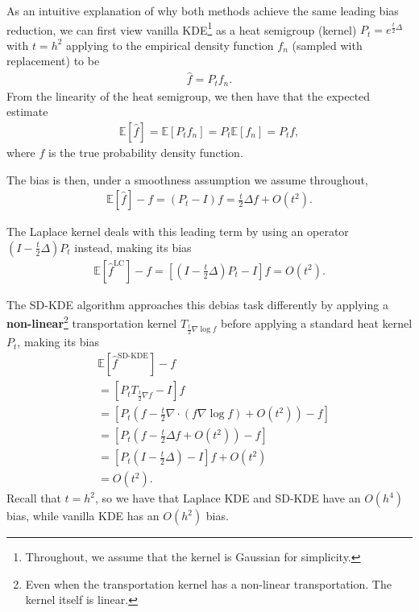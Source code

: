 As an intuitive explanation of why both methods achieve the same leading bias reduction, we can first view vanilla KDE\footnote{Throughout, we assume that the kernel is Gaussian for simplicity.} as a heat semigroup (kernel) $P_{t} = e^{\frac{t}{2}\Delta}$ with $t = h^2$ applying to the empirical density  function $f_n$ (sampled with replacement) to be
\begin{align*}
    \hat{f} = P_t f_n.
\end{align*}
From the linearity of the heat semigroup, we then have that the expected estimate
\begin{align*}
    \mathbb{E}\left[\hat{f}\right]
    =\mathbb{E}\left[P_t f_n\right]
    =P_t\mathbb{E}\left[ f_n\right]
    =P_tf,
\end{align*}
where $f$ is the true probability density function.

The bias is then, under a smoothness assumption we assume throughout,
\begin{align*}
    \mathbb{E}\left[\hat{f}\right]-f = (P_t-I)f = \frac{t}{2} \Delta f + O(t^2).
\end{align*}

The Laplace kernel deals with this leading term by using an operator $\left(I-\frac{t}{2}\Delta\right)P_t$ instead, making its bias
\begin{align*}
    \mathbb{E}\left[\hat{f}^{\text{LC}}\right]-f = \left[\left(I-\frac{t}{2}\Delta\right)P_t-I\right]f = O(t^2).
\end{align*}

The SD-KDE algorithm approaches this debias task differently by applying a \textbf{non-linear}\footnote{Even when the transportation kernel has a non-linear transportation. The kernel itself is linear.} transportation kernel $T_{\frac{t}{2}\nabla \log f}$ before applying a standard heat kernel $P_t$, making its bias
\begin{align*}
    &\mathbb{E}\left[\hat{f}^{\text{SD-KDE}}\right]-f\\ &= \left[P_tT_{\frac{t}{2}\nabla f}-I\right]f\\
    &=
    \left[P_t\left(f - \frac{t}{2}\nabla \cdot \left(f\nabla \log f\right) + O(t^2)\right)-f\right]\\
    &=
    \left[P_t\left(f - \frac{t}{2}\Delta f + O(t^2)\right)-f\right]\\
    &=
    \left[P_t\left(I - \frac{t}{2}\Delta  \right)-I\right]f+ O(t^2)\\
    &= O(t^2).
\end{align*}
Recall that $t=h^2$, so we have that Laplace KDE and SD-KDE have an $O(h^4)$ bias, while vanilla KDE has an $O(h^2)$ bias.

